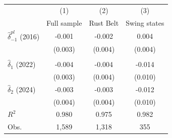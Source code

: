 {
\def\sym#1{\ifmmode^{#1}\else\(^{#1}\)\fi}
\begin{tabular}{l*{3}{c}}
\toprule
                         &\multicolumn{1}{c}{(1)}         &\multicolumn{1}{c}{(2)}         &\multicolumn{1}{c}{(3)}         \\
                         & Full sample         &   Rust Belt         &Swing states         \\
\midrule
$\hat{\delta}_{-1}^{pl}$ (2016)&      -0.001         &      -0.002         &       0.004         \\
                         &     (0.003)         &     (0.004)         &     (0.004)         \\
\addlinespace
\addlinespace            &                     &                     &                     \\
\addlinespace
$\hat{\delta}_{1}$ (2022)&      -0.004         &      -0.004         &      -0.014         \\
                         &     (0.003)         &     (0.004)         &     (0.010)         \\
\addlinespace
$\hat{\delta}_{2}$ (2024)&      -0.003         &      -0.003         &      -0.012         \\
                         &     (0.004)         &     (0.004)         &     (0.010)         \\
\midrule
\(R^{2}\)                &       0.980         &       0.975         &       0.982         \\
Obs.                     &       1,589         &       1,318         &         355         \\
\bottomrule
\end{tabular}
}
